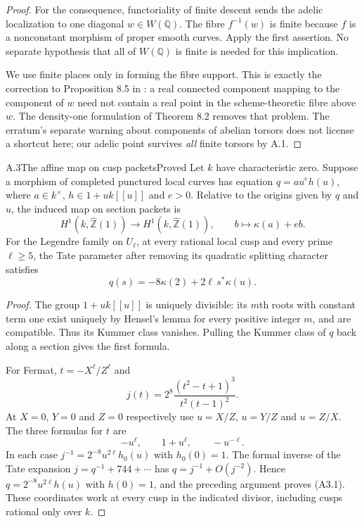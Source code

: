 \begin{proof}
For the consequence, functoriality of finite descent sends the adelic
localization to one diagonal $w\in W(\mathbb Q)$. The fibre $f^{-1}(w)$ is
finite because $f$ is a nonconstant morphism of proper smooth curves.
Apply the first assertion. No separate hypothesis that all of $W(\mathbb Q)$
is finite is needed for this implication.

We use finite places only in forming the fibre support. This is exactly the
correction to Proposition 8.5 in \citet[\S3]{AMStollErrata2017}: a real
connected component mapping to the component of $w$ need not contain a real
point in the scheme-theoretic fibre above $w$. The density-one formulation
of Theorem 8.2 removes that problem. The erratum's separate warning about
components of abelian torsors does not license a shortcut here; our adelic
point survives \emph{all} finite torsors by A.1.
\end{proof}

\begin{statement}{A.3}{The affine map on cusp packets}{Proved}
Let $k$ have characteristic zero. Suppose a morphism of completed punctured
local curves has equation $q=a u^e h(u)$, where $a\in k^\times$,
$h\in1+u k[[u]]$ and $e>0$. Relative to the origins given by $q$ and $u$,
the induced map on section packets is
\[
 H^1(k,\widehat{\mathbb Z}(1))\longrightarrow
 H^1(k,\widehat{\mathbb Z}(1)),\qquad
 b\longmapsto\kappa(a)+eb.
\]
For the Legendre family on $U_\ell$, at every rational local cusp and every
prime $\ell\geq5$, the Tate parameter after removing its quadratic
splitting character satisfies
\[
 q(s)=-8\kappa(2)+2\ell\,s^*\kappa(u).
 \tag{A3.1}
\]
\end{statement}
\begin{proof}
The group $1+u k[[u]]$ is uniquely divisible: its $m$th roots with constant
term one exist uniquely by Hensel's lemma for every positive integer $m$,
and are compatible. Thus its Kummer class vanishes. Pulling the Kummer
class of $q$ back along a section gives the first formula.

For Fermat, $t=-X^\ell/Z^\ell$ and
\[
 j(t)=2^8\frac{(t^2-t+1)^3}{t^2(t-1)^2}.
\]
At $X=0$, $Y=0$ and $Z=0$ respectively use $u=X/Z$, $u=Y/Z$ and
$u=Z/X$. The three formulas for $t$ are
\[
 -u^\ell,\qquad 1+u^\ell,\qquad -u^{-\ell}.
\]
In each case $j^{-1}=2^{-8}u^{2\ell}h_0(u)$ with $h_0(0)=1$.
The formal inverse of the Tate expansion $j=q^{-1}+744+\cdots$ has
$q=j^{-1}+O(j^{-2})$. Hence $q=2^{-8}u^{2\ell}h(u)$ with $h(0)=1$,
and the preceding argument proves (A3.1). These coordinates work at every
cusp in the indicated divisor, including cusps rational only over $k$.
\end{proof}

